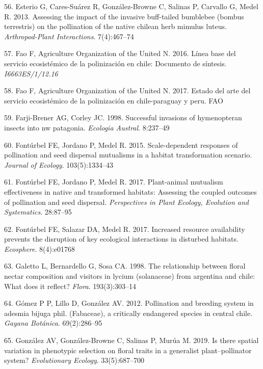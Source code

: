 \documentclass[
]{article}
\begin{document}
\leavevmode\hypertarget{ref-RN120}{}%
56. Esterio G, Cares-Suárez R, González-Browne C, Salinas P, Carvallo G,
Medel R. 2013. Assessing the impact of the invasive buff-tailed
bumblebee (bombus terrestris) on the pollination of the native chilean
herb mimulus luteus. \emph{Arthropod-Plant Interactions}. 7(4):467--74

\leavevmode\hypertarget{ref-RN33}{}%
57. Fao F, Agriculture Organization of the United N. 2016. Línea base
del servicio ecosistémico de la polinización en chile: Documento de
síntesis. \emph{I6663ES/1/12.16}

\leavevmode\hypertarget{ref-RN32}{}%
58. Fao F, Agriculture Organization of the United N. 2017. Estado del
arte del servicio ecosistémico de la polinización en chile-paraguay y
peru. FAO

\leavevmode\hypertarget{ref-RN34}{}%
59. Farji-Brener AG, Corley JC. 1998. Successful invasions of
hymenopteran insects into nw patagonia. \emph{Ecologia Austral}.
8:237--49

\leavevmode\hypertarget{ref-RN35}{}%
60. Fontúrbel FE, Jordano P, Medel R. 2015. Scale-dependent responses of
pollination and seed dispersal mutualisms in a habitat transformation
scenario. \emph{Journal of Ecology}. 103(5):1334--43

\leavevmode\hypertarget{ref-RN36}{}%
61. Fontúrbel FE, Jordano P, Medel R. 2017. Plant-animal mutualism
effectiveness in native and transformed habitats: Assessing the coupled
outcomes of pollination and seed dispersal. \emph{Perspectives in Plant
Ecology, Evolution and Systematics}. 28:87--95

\leavevmode\hypertarget{ref-RN37}{}%
62. Fontúrbel FE, Salazar DA, Medel R. 2017. Increased resource
availability prevents the disruption of key ecological interactions in
disturbed habitats. \emph{Ecosphere}. 8(4):e01768

\leavevmode\hypertarget{ref-RN121}{}%
63. Galetto L, Bernardello G, Sosa CA. 1998. The relationship between
floral nectar composition and visitors in lycium (solanaceae) from
argentina and chile: What does it reflect? \emph{Flora}. 193(3):303--14

\leavevmode\hypertarget{ref-RN38}{}%
64. Gómez P P, Lillo D, González AV. 2012. Pollination and breeding
system in adesmia bijuga phil. (Fabaceae), a critically endangered
species in central chile. \emph{Gayana Botánica}. 69(2):286--95

\leavevmode\hypertarget{ref-RN39}{}%
65. González AV, González-Browne C, Salinas P, Murúa M. 2019. Is there
spatial variation in phenotypic selection on floral traits in a
generalist plant--pollinator system? \emph{Evolutionary Ecology}.
33(5):687--700
\end{document}
